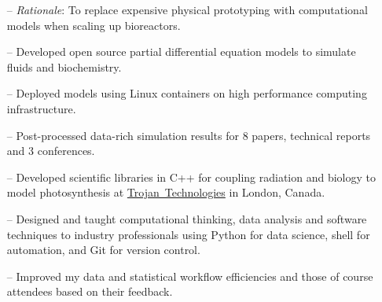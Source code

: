\documentclass[10.5pt,a4paper]{altacv}
\begin{document}


\begin{fullwidth}
\makecvheader

\end{fullwidth}




\begin{itemize}
    \setlength{\itemindent}{0.3em}
    \item[--]  \small{\textit{Rationale}: To replace expensive physical 
    prototyping with computational models when scaling up bioreactors.}
    \item[--]   \small{Developed open source partial differential equation
    models to simulate fluids and biochemistry.} 
    \item[--] \small{Deployed models using Linux containers 
    on high performance computing infrastructure.}
    \item[--]  \small{Post-processed data-rich simulation results for 8 papers, 
    technical reports and 3 conferences.}
    \item[--]   \small{Developed scientific libraries in C++ for coupling 
    radiation and biology to model photosynthesis at 
    \href{https://www.trojantechnologies.com/}{Trojan~Technologies} 
    in London, Canada.}
\end{itemize}
\divider\smallskip

\begin{itemize}
    \setlength{\itemindent}{0.3em}
    \item[--]   \small{Designed and taught computational thinking, 
    data analysis and software techniques to industry professionals using
    Python for data science, shell for automation, and Git for version
    control.}
    \item[--]   \small{Improved my data and statistical workflow 
    efficiencies and those of course attendees based on their feedback.}
\end{itemize}
\divider\smallskip
\end{document}
